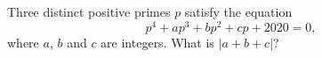 Three distinct positive primes $p$ satisfy the equation
\[p^4+ap^3+bp^2+cp+2020=0,\]
where $a$, $b$ and $c$ are integers. What is $|a+b+c|$?
